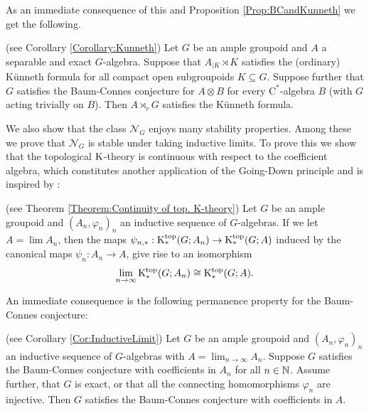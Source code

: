 	As an immediate consequence of this and Proposition \ref{Prop:BCandKunneth} we get the following.
	\begin{corx}(see Corollary \ref{Corollary:Kunneth})
		Let $G$ be an ample groupoid and $A$ a separable and exact $G$-algebra. Suppose that $A_{\mid K}\rtimes K$ satisfies the (ordinary) Künneth formula for all compact open subgroupoids $K\subseteq G$. Suppose further that $G$ satisfies the Baum-Connes conjecture for $A\otimes B$ for every $\mathrm{C}^*$-algebra $B$ (with $G$ acting trivially on $B$).
		Then $A\rtimes_r G$ satisfies the Künneth formula. 
	\end{corx}
	
	We also show that the class $\mathcal{N}_G$ enjoys many stability properties. Among these we prove that $\mathcal{N}_G$ is stable under taking inductive limits. To prove this we show that the topological $\mathrm K$-theory is continuous with respect to the coefficient algebra, which constitutes another application of the Going-Down principle and is inspired by \cite[§7]{MR1836047}:
	\begin{thmx}(see Theorem \ref{Theorem:Continuity of top. K-theory})
		Let $G$ be an ample groupoid and $(A_n,\varphi_n)_n$ an inductive sequence of $G$-algebras. If we let $A=\lim A_n$, then the maps $\psi_{n,*}:\mathrm K_*^{\mathrm{top}}(G;A_n)\rightarrow \mathrm K_*^{\mathrm{top}}(G;A)$ induced by the canonical maps $\psi_n:A_n\rightarrow A$, give rise to an isomorphism
		$$\lim_{n\rightarrow\infty}\mathrm K_*^{\mathrm{top}}(G;A_n)\cong \mathrm K_*^{\mathrm{top}}(G;A).$$
	\end{thmx}
	An immediate consequence is the following permanence property for the Baum-Connes conjecture:
	\begin{corx}(see Corollary \ref{Cor:InductiveLimit})
		Let $G$ be an ample groupoid and $(A_n,\varphi_n)_n$ an inductive sequence of $G$-algebras with $A=\lim_{n\rightarrow\infty}A_n$. Suppose $G$ satisfies the Baum-Connes conjecture with coefficients in $A_n$ for all $n\in\mathbb N$. Assume further, that $G$ is exact, or that all the connecting homomorphisms $\varphi_n$ are injective. Then $G$ satisfies the Baum-Connes conjecture with coefficients in $A$.
	\end{corx}
	

	
